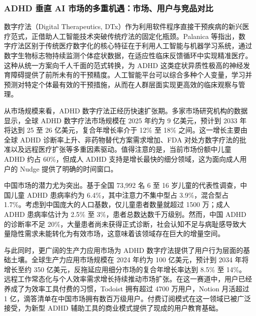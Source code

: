 \subsubsection{ADHD 垂直 AI 市场的多重机遇：市场、用户与竞品对比}

%

\par 数字疗法（Digital Therapeutics, DTx）作为利用软件程序直接干预疾病的新兴医疗范式，正借助人工智能技术突破传统疗法的固定化瓶颈。Palanica 等指出，数字疗法区别于传统医疗数字化的核心特征在于利用人工智能与机器学习系统，通过数字生物标志物持续监测个体症状数据，在适应性临床反馈循环中实现精准医疗\cite{palanica2020need}。这种从统一方案向千人千面的范式转换，为 ADHD 这类症状异质性极高的神经发育障碍提供了前所未有的干预精度。人工智能平台可以综合多种个人变量，学习并预测对特定个体最有效的干预措施，从而在人群层面实现更高效的临床观察与管理。

\par 从市场规模来看，ADHD 数字疗法正经历快速扩张期。多家市场研究机构的数据显示，全球 ADHD 数字疗法市场规模在 2025 年约为 9 亿美元，预计到 2033 年将达到 25 至 26 亿美元，复合年增长率介于 12\% 至 18\% 之间\cite{adhdmarket2025}。这一增长主要由全球 ADHD 诊断率上升、非药物替代方案需求增加、FDA 对处方数字疗法的批准以及远程医疗扩张等多重因素驱动。值得注意的是，当前市场份额中儿童 ADHD 约占 60\%，但成人 ADHD 支持是增长最快的细分领域，这为面向成人用户的 Nudge 提供了明确的时间窗口。

\par 中国市场的潜力尤为突出。基于全国 73,992 名 6 至 16 岁儿童的代表性调查，中国儿童 ADHD 患病率约为 6.4\%，其中注意力不集中型占 3.9\%，混合型占 1.7\%\cite{chinaburden2025}。考虑到中国庞大的人口基数，仅儿童患者数量就超过 1500 万；成人 ADHD 患病率估计为 2.5\% 至 3\%，患者总数达数千万级别。然而，中国 ADHD 的诊断率不足 20\%，大量患者尚未获得正式诊断，社会认知不足与病耻感导致大量隐性需求未能转化为有效市场，这意味着该领域存在巨大的增量空间。

\par 与此同时，更广阔的生产力应用市场为 ADHD 数字疗法提供了用户行为层面的基础土壤。全球生产力应用市场规模在 2024 年约为 100 亿美元，预计到 2034 年将增长至约 350 亿美元，反拖延应用细分市场的复合年增长率达到 8.5\% 至 14\%\cite{productivitymarket2025}。远程工作常态化与个人效率需求增长持续推动市场扩张。在这一赛道中，用户已经养成了为效率工具付费的习惯，Todoist 拥有超过 4700 万用户，Notion 月活超过 1 亿，滴答清单在中国市场拥有数百万级用户。付费订阅模式在这一领域已被广泛接受，为新型 ADHD 辅助工具的商业模式提供了现成的用户教育基础。

